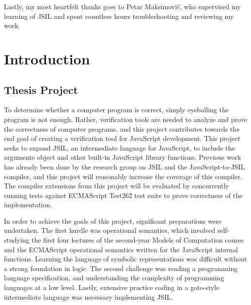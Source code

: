 \documentclass[a4paper,11pt,twoside]{report}
\begin{document}
Lastly, my most heartfelt thanks goes to Petar Maksimovi\'c, who supervised my learning of JSIL and spent countless hours troubleshooting and reviewing my work. 

\clearpage{\pagestyle{empty}\cleardoublepage}

\tableofcontents 


\clearpage{\pagestyle{empty}\cleardoublepage}
\setcounter{page}{1}
\fancyhead[LE,RO]{\slshape \rightmark}
\fancyhead[LO,RE]{\slshape \leftmark}

\chapter{Introduction}
\label{cha:intro}

\section{Thesis Project}
To determine whether a computer program is correct, simply eyeballing the program is not enough. Rather, verification tools are needed to analyze and prove the correctness of computer programs, and this project contributes towards the end goal of creating a verification tool for JavaScript development. This project seeks to expand JSIL, an intermediate language for JavaScript, to include the arguments object and other built-in JavaScript library functions. Previous work has already been done by the research group on JSIL and the JavaScript-to-JSIL compiler, and this project will reasonably increase the coverage of this compiler. The compiler extensions from this project will be evaluated by concurrently running tests against ECMAScript Test262 test suite to prove correctness of the implementation.

In order to achieve the goals of this project, significant preparations were undertaken. The first hurdle was operational semantics, which involved self-studying the first four lectures of the second-year Models of Computation course and the ECMAScript operational semantics written for the JavaScript internal functions. Learning the language of symbolic representations was difficult without a strong foundation in logic. The second challenge was reading a programming language specification, and understanding the complexity of programming languages at a low level. Lastly, extensive practice coding in a goto-style intermediate language was necessary implementing JSIL.
\end{document}
